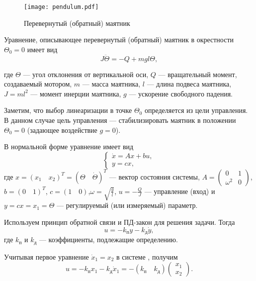 \documentclass[../../TAU.tex]{subfiles}
\begin{document}
    \begin{figure}[h]
    \centering
    \texttt{[image: pendulum.pdf]}
    \caption{Перевернутый (обратный) маятник}
    \centering
    \end{figure}

    Уравнение, описывающее перевернутый (обратный) маятник в окрестности $\Theta_0=0$ имеет вид
    \begin{equation}\label{EQ1_1}
    J\ddot\Theta = -Q+mgl\Theta,
    \end{equation}
    {\small где $\Theta$ --- угол отклонения от вертикальной оси, $Q$ --- вращательный момент, создаваемый мотором, $m$ --- масса маятника, $l$ --- длина подвеса
    маятника, $J = ml^2$ --- момент инерции маятника, $g$ --- ускорение свободного падения.

    Заметим, что выбор линеаризации в точке $\Theta_0$ определяется из цели управления. В данном случае цель управления --- стабилизировать маятник в положении $\Theta_0 = 0$ (задающее воздействие $g = 0$).
    }

    В нормальной форме уравнение  имеет вид
    \begin{equation}\label{EQ1_1NORM}
    \begin{cases}
    \dot x = Ax + bu,\\
    y = c x,
    \end{cases}
    \end{equation}
    где $x = (x_1\quad x_2)^T = ( \Theta\quad \dot\Theta)^T$ --- вектор состояния системы, $A =\begin{pmatrix}0 & 1\\ \omega^2& 0\end{pmatrix}$,$b = (0\quad 1)^T$, $c = (1\quad0)$,$\omega = \sqrt{\frac{g}{l}}$, $u = -\frac{Q}{J}$ --- управление (вход) и $y = cx = x_1 = \Theta$ --- регулируемый (или измеряемый) параметр.



    Используем принцип обратной связи и ПД-закон для решения задачи. Тогда
    $$
    u = -k_\text{п} y - k_\text{д} \dot y,
    $$
    где $k_\text{п}$ и $k_\text{д}$ --- коэффициенты, подлежащие определению.

    Учитывая первое уравнение $\dot x_1 = x_2$ в системе , получим
    $$
    u = - k_\text{п} x_1 - k_\text{д} \dot x_1 = - (k_\text{п}\quad k_\text{д}) \begin{pmatrix}x_1 \\ x_2\end{pmatrix}.
    $$
\end{document}
